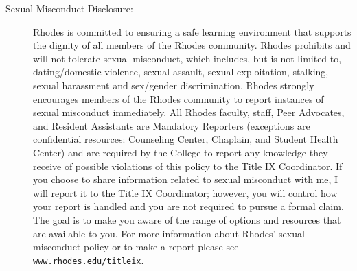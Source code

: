 \documentclass [letterpaper,11pt]{article}
\begin{document}
\begin{description}
\item[Sexual Misconduct Disclosure:]
Rhodes is committed to ensuring a safe learning environment that supports the dignity of all members of the Rhodes community. Rhodes prohibits and will not tolerate sexual misconduct, which includes, but is not limited to, dating/domestic violence, sexual assault, sexual exploitation, stalking, sexual harassment and sex/gender discrimination. Rhodes strongly encourages members of the Rhodes community to report instances of sexual misconduct immediately.  All Rhodes faculty, staff, Peer Advocates, and Resident Assistants are Mandatory Reporters (exceptions are confidential resources: Counseling Center, Chaplain, and Student Health Center) and are required by the College to report any knowledge they receive of possible violations of this policy to the Title IX Coordinator.  If you choose to share information related to sexual misconduct with me, I will report it to the Title IX Coordinator; however, you will control how your report is handled and you are not required to pursue a formal claim.  The goal is to make you aware of the range of options and resources that are available to you.  For more information about Rhodes' sexual misconduct policy or to make a report please see \texttt{www.rhodes.edu/titleix}.



\end{description}

   
\end{document}
